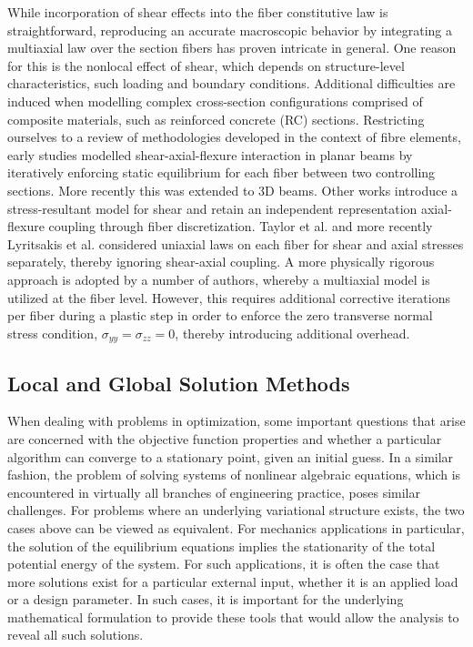 While incorporation of shear effects into the fiber constitutive law is
straightforward, reproducing an accurate macroscopic behavior by integrating
a multiaxial law over the section fibers has proven intricate in general. 
One reason for
this is the nonlocal effect of shear, which depends on structure-level 
characteristics, such loading and boundary conditions\cite{Drucker1956}.
Additional difficulties are induced when modelling complex cross-section
configurations comprised of composite materials, such as reinforced 
concrete (RC) sections. Restricting ourselves to a
review of methodologies developed in the context of fibre
elements, early studies\cite{Vecchio1986,Vecchio1988} modelled
shear-axial-flexure interaction in planar beams by iteratively enforcing 
static equilibrium for each fiber between two controlling sections. More
recently this was extended to 3D beams\cite{Bairan2007}. Other works 
introduce a stress-resultant model for shear and retain an independent 
representation axial-flexure coupling through fiber 
discretization\cite{Ranzo1998,Martino2000,Marini2006}. Taylor et
al.\cite{Taylor2003} and more recently Lyritsakis et al.\cite{Lyritsakis2021}
considered uniaxial laws on each fiber for shear and axial stresses 
separately, thereby ignoring shear-axial coupling. A more physically
rigorous approach is adopted by a number of
authors\cite{Papachristidis2010,Saritas2009,Ceresa2009,Gregori2007,Kagermanov2017},
whereby a multiaxial model is utilized at the fiber level. However, this
requires additional corrective iterations per
fiber\cite{Klinkel2002,Dodds1987,DeSouza2011} during a plastic 
step in order to enforce the zero transverse normal stress condition,
$\sigma_{yy}=\sigma_{zz}=0$, thereby introducing additional overhead.

\subsection{Local and Global Solution Methods}

When dealing with problems in optimization, some important questions that arise 
are concerned with the objective function properties and whether a particular 
algorithm can converge to a stationary point, given an initial guess. In a 
similar fashion, the problem of solving systems of nonlinear algebraic 
equations, which is encountered in virtually all branches of engineering 
practice, poses similar challenges. For problems where an underlying 
variational structure exists, the two cases above can be viewed as equivalent. 
For mechanics applications in particular, the solution of the equilibrium 
equations implies the stationarity of the total potential energy of the system. 
For such applications, it is often the case that more solutions exist for a 
particular external input, whether it is an applied load or a design parameter. 
In such cases, it is important for the underlying mathematical formulation to 
provide these tools that would allow the analysis to reveal all such solutions.

